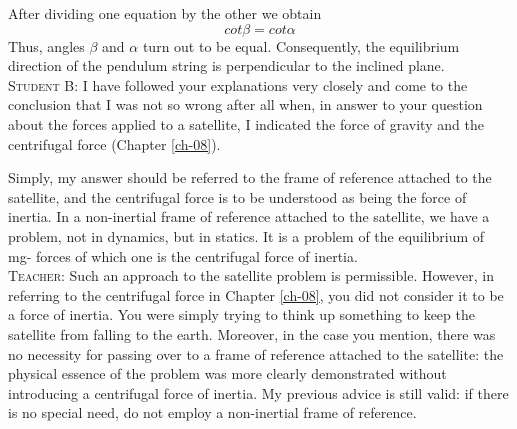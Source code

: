 \documentclass[a4paper,sfsidenotes]{tufte-book}
\begin{document}
After dividing one equation by the other we obtain
\\
\begin{equation*}
cot \beta = cot \alpha
\end{equation*}
Thus, angles $\beta$ and $\alpha$ turn out to be equal. Consequently, the equilibrium direction of the pendulum string is perpendicular to the inclined plane.
\\
\textsc{Student B:} I have followed your explanations very closely and come to the conclusion that I was not so wrong after all when, in answer to your question about the forces applied to a satellite, I indicated the force of gravity and the centrifugal force (Chapter \ref{ch-08}).

Simply, my answer should be referred to the frame of reference attached to the satellite, and the centrifugal force is to be understood as being the force of inertia. In a non-inertial frame of reference attached to the satellite, we have a problem, not in dynamics, but in statics. It is a problem of the equilibrium of mg- forces of which one is the centrifugal force of inertia.
\\
\textsc{Teacher:} Such an approach to the satellite problem is permissible. However, in referring to the centrifugal force in Chapter \ref{ch-08}, you did not consider it to be a force of inertia. You were
simply trying to think up something to keep the satellite from falling to the earth. Moreover, in the case you mention, there was no necessity for passing over to a frame of reference attached to the satellite: the physical essence of the problem was more clearly demonstrated without introducing a centrifugal
force of inertia. My previous advice is still valid: if there is no special need, do not employ a non-inertial frame of reference.

\cleardoublepage
\thispagestyle{empty}
\vspace*{2cm}
\end{document}
